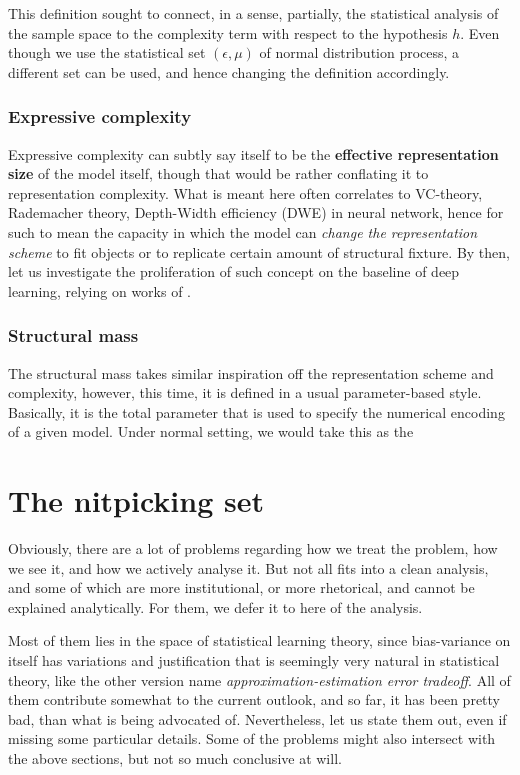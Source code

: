 This definition sought to connect, in a sense, partially, the statistical analysis of the sample space to the complexity term with respect to the hypothesis $h$. Even though we use the statistical set $(\epsilon,\mu)$ of normal distribution process, a different set can be used, and hence changing the definition accordingly. 
\subsubsection{Expressive complexity}

Expressive complexity can subtly say itself to be the \textbf{effective representation size} of the model itself, though that would be rather conflating it to representation complexity. What is meant here often correlates to VC-theory, Rademacher theory, Depth-Width efficiency (DWE) in neural network, hence for such to mean the capacity in which the model can \textit{change the representation scheme} to fit objects or to replicate certain amount of structural fixture. By then, let us investigate the proliferation of such concept on the baseline of deep learning, relying on works of \cite{hu2021modelcomplexitydeeplearning}.  

\subsubsection{Structural mass}

The structural mass takes similar inspiration off the representation scheme and complexity, however, this time, it is defined in a usual parameter-based style. Basically, it is the total parameter that is used to specify the numerical encoding of a given model. Under normal setting, we would take this as the 

\section{The nitpicking set}

Obviously, there are a lot of problems regarding how we treat the problem, how we see it, and how we actively analyse it. But not all fits into a clean analysis, and some of which are more institutional, or more rhetorical, and cannot be explained analytically. For them, we defer it to here of the analysis. 

Most of them lies in the space of statistical learning theory, since bias-variance on itself has variations and justification that is seemingly very natural in statistical theory, like the other version name \textit{approximation-estimation error tradeoff}. All of them contribute somewhat to the current outlook, and so far, it has been pretty bad, than what is being advocated of. Nevertheless, let us state them out, even if missing some particular details. Some of the problems might also intersect with the above sections, but not so much conclusive at will.  

